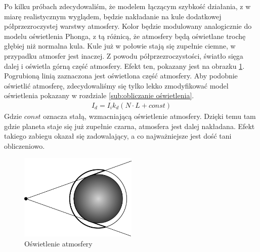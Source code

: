 Po kilku próbach zdecydowaliśm, że modelem łączącym szybkość działania, z w miarę realistycznym wyglądem, będzie nakładanie na kule dodatkowej półprzezroczystej warstwy atmosfery. Kolor będzie modulowany analogicznie do modelu oświetlenia Phonga, z tą różnicą, że atmosfery będą oświetlane trochę głębiej niż normalna kula. Kule już w połowie stają się zupełnie ciemne, w przypadku atmosfer jest inaczej. Z powodu półprzezroczystości, światło sięga dalej i oświetla górną część atmosfery. Efekt ten, pokazany jest na obrazku \hyperref[fig:atmo]{\ref{fig:atmo}}. Pogrubioną linią zaznaczona jest oświetlona część atmosfery. Aby podobnie oświetlić atmosferę, zdecydowaliśmy się tylko lekko zmodyfikować model oświetlenia pokazany w rozdziale \hyperref[sub:obliczanie oświetlenia]{\ref{sub:obliczanie oświetlenia}}.
\begin{eqnarray}
I_d = I_i k_d( N \cdot L + const )
\end{eqnarray}
Gdzie $const$ oznacza stałą, wzmacniającą oświetlenie atmosfery. Dzięki temu tam gdzie planeta staje się już zupełnie czarna, atmosfera jest dalej nakładana. Efekt takiego zabiegu okazał się zadowalający, a co najważniejsze jest dość tani obliczeniowo.


\begin{figure}
\centering
	\includegraphics[width=0.5\textwidth]{img/atm.pdf}
\caption{Oświetlenie atmosfery}
\label{fig:atmo}
\end{figure}

\paragraph{}

